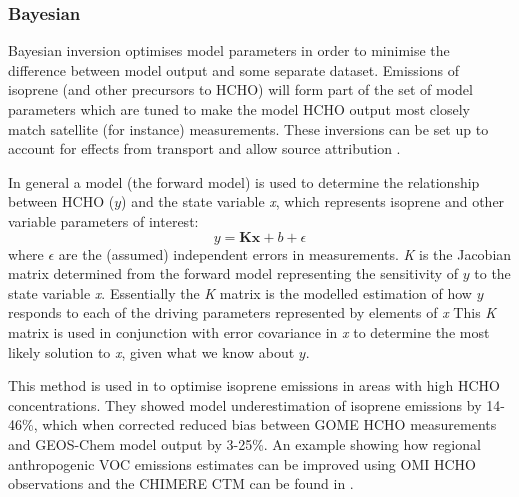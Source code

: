     
    \subsubsection{Bayesian}
    
      Bayesian inversion optimises model parameters in order to minimise the difference between model output and some separate dataset.
      Emissions of isoprene (and other precursors to HCHO) will form part of the set of model parameters which are tuned to make the model HCHO output most closely match satellite (for instance) measurements.
      These inversions can be set up to account for effects from transport and allow source attribution \parencite[e.g.][]{Curci2010,FortemsCheiney2012}.
      
      In general a model (the forward model) is used to determine the relationship between HCHO ($y$) and the state variable \emph{x}, which represents isoprene and other variable parameters of interest:
      \begin{equation}
        \label{BioIsop:intro:top_down_estimates:eqn_bayesian}
        y=\mathbf{Kx} + b + \epsilon
      \end{equation}
      where $\epsilon$ are the (assumed) independent errors in measurements.
      \emph{K} is the Jacobian matrix determined from the forward model representing the sensitivity of $y$ to the state variable \emph{x}.
      Essentially the \emph{K} matrix is the modelled estimation of how $y$ responds to each of the driving parameters represented by elements of \emph{x}
      This \emph{K} matrix is used in conjunction with error covariance in \emph{x} to determine the most likely solution to \emph{x}, given what we know about $y$. %
      
      This method is used in \textcite{Shim2005} to optimise isoprene emissions in areas with high HCHO concentrations. 
      They showed model underestimation of isoprene emissions by 14-46\%, which when corrected reduced bias between GOME HCHO measurements and GEOS-Chem model output by 3-25\%.
      An example showing how regional anthropogenic VOC emissions estimates can be improved using OMI HCHO observations and the CHIMERE CTM can be found in \textcite{Curci2010}.
      
